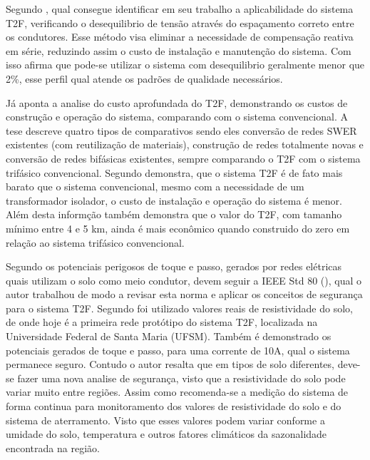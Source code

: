 \documentclass[oneside,openright,12pt]{ufsm_2021} %
\begin{document}
\par Segundo \cite{marchesan_three-phase-two-wire_2023}, qual consegue identificar em seu trabalho a aplicabilidade do sistema T2F, verificando o desequilibrio de tensão através do espaçamento correto entre os condutores. Esse método visa eliminar a necessidade de compensação reativa em série, reduzindo assim o custo de instalação e manutenção do sistema. Com isso \cite{marchesan_three-phase-two-wire_2023} afirma que pode-se utilizar o sistema com desequilibrio geralmente menor que 2\%, esse perfil qual atende os padrões de qualidade necessários.

\par Já \cite{kraulich_cost_2023} aponta a analise do custo aprofundada do T2F, demonstrando os custos de construção e operação do sistema, comparando com o sistema convencional. A tese descreve quatro tipos de comparativos sendo eles conversão de redes SWER existentes (com reutilização de materiais), construção de redes totalmente novas e conversão de redes bifásicas existentes, sempre comparando o T2F com o sistema trifásico convencional. Segundo \cite{kraulich_alise_2024} demonstra, que o sistema T2F é de fato mais barato que o sistema convencional, mesmo com a necessidade de um transformador isolador, o custo de instalação e operação do sistema é menor. Além desta informção \cite{kraulich_alise_2024} também demonstra que o valor do T2F, com tamanho mínimo entre 4 e 5 km, ainda é mais econômico quando construido do zero em relação ao sistema trifásico convencional.

\par Segundo \cite{martins_alise_2022} os potenciais perigosos de toque e passo, gerados por redes elétricas quais utilizam o solo como meio condutor, devem seguir a IEEE Std 80 (\citeyear{ieee_ieee_2015}), qual o autor trabalhou de modo a revisar esta norma e aplicar os conceitos de segurança para o sistema T2F. Segundo \cite{martins_alise_2022} foi utilizado valores reais de resistividade do solo, de onde hoje é a primeira rede protótipo do sistema T2F, localizada na Universidade Federal de Santa Maria (UFSM). Também é demonstrado os potenciais gerados de toque e passo, para uma corrente de 10A, qual o sistema permanece seguro. Contudo o autor resalta que em tipos de solo diferentes, deve-se fazer uma nova analise de segurança, visto que a resistividade do solo pode variar muito entre regiões. Assim como recomenda-se a medição do sistema de forma continua para monitoramento dos valores de resistividade do solo e do sistema de aterramento. Visto que esses valores podem variar conforme a umidade do solo, temperatura e outros fatores climáticos da sazonalidade encontrada na região.
\end{document}
